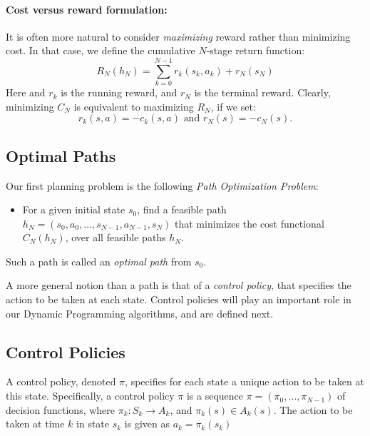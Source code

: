 \paragraph{Cost versus reward formulation: }It is often more natural to consider \emph{maximizing} reward rather than minimizing cost.  In that case, we define the cumulative $N$-stage return function:
$${R_N}({h_N}) = \sum\limits_{k = 0}^{N - 1} {{r_k}({s_k},{a_k}) + {r_N}({s_N})} $$
Here and ${r_k}$ is the running reward, and  ${r_N}$ is the terminal reward.
Clearly, minimizing ${C_N}$ is equivalent to maximizing ${R_N}$, if we set:
$${r_k}(s,a) =  - {c_k}(s,a) \text{ and }{r_N}(s) =  - {c_N}(s).$$


\subsection{Optimal Paths}

Our first planning problem is the following \emph{Path Optimization Problem}:
\begin{itemize}
  \item For a given initial state ${s_0}$, find a feasible path ${h_N} = ({s_0},{a_0}, \ldots ,{s_{N - 1}},{a_{N - 1}},{s_N})$ that minimizes the cost functional ${C_N}({h_N})$, over all feasible paths ${h_N}$.
\end{itemize}

Such a path is called an \emph{optimal path} from ${s_0}$.

A more general notion than a path is that of a \emph{control policy}, that specifies the action to be taken at each state. Control policies will play an important role in our Dynamic Programming algorithms, and are defined next.

\subsection{Control Policies}

\begin{definition} A control policy, denoted $\pi $, specifies for each state a unique action to be taken at this state. Specifically, a control policy  $\pi $ is a sequence $\pi  = ({\pi _0}, \ldots ,{\pi _{N - 1}})$ of decision functions, where
${\pi _k}:{S_k} \to {A_k}$,    and  ${\pi _k}(s) \in {A_k}(s)$.
The action to be taken at time $k$ in state ${s_k}$ is given as
${a_k} = {\pi _k}({s_k})$
\end{definition}

